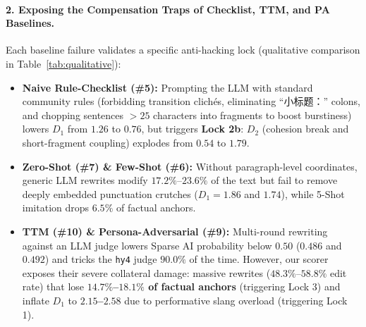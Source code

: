 \documentclass[11pt]{article}
\newcommand{\zh}[1]{#1}
\begin{document}
\paragraph{2. Exposing the Compensation Traps of Checklist, TTM, and PA Baselines.}
Each baseline failure validates a specific anti-hacking lock (qualitative comparison in Table~\ref{tab:qualitative}):
\begin{itemize}
    \item \textbf{Naive Rule-Checklist (\#5):} Prompting the LLM with standard community rules (forbidding transition clichés, eliminating ``\zh{小标题：}'' colons, and chopping sentences $>25$ characters into fragments to boost burstiness) lowers $D_1$ from $1.26$ to $0.76$, but triggers \textbf{Lock 2b}: $D_2$ (cohesion break and short-fragment coupling) explodes from $0.54$ to \textbf{$1.79$}.
    \item \textbf{Zero-Shot (\#7) \& Few-Shot (\#6):} Without paragraph-level coordinates, generic LLM rewrites modify $17.2\%$--$23.6\%$ of the text but fail to remove deeply embedded punctuation crutches ($D_1 = 1.86$ and $1.74$), while 5-Shot imitation drops $6.5\%$ of factual anchors.
    \item \textbf{TTM (\#10) \& Persona-Adversarial (\#9):} Multi-round rewriting against an LLM judge lowers Sparse AI probability below $0.50$ ($0.486$ and $0.492$) and tricks the \texttt{hy4} judge $90.0\%$ of the time. However, our scorer exposes their severe collateral damage: massive rewrites ($48.3\%$--$58.8\%$ edit rate) that lose \textbf{$14.7\%$--$18.1\%$ of factual anchors} (triggering Lock 3) and inflate $D_1$ to \textbf{$2.15$--$2.58$} due to performative slang overload (triggering Lock 1).
\end{itemize}
\end{document}
